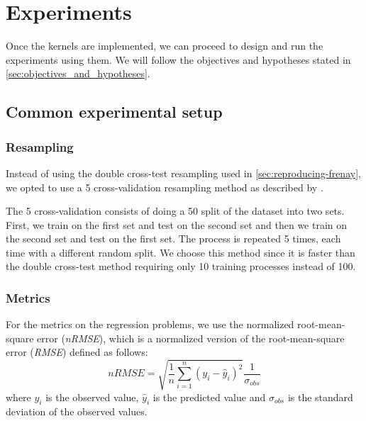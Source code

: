 \chapter{Experiments}
\label{sec:experiments}

Once the kernels are implemented, we can proceed to design and run the
experiments using them. We will follow the objectives and hypotheses stated in
\cref{sec:objectives_and_hypotheses}.

\section{Common experimental setup}

\subsection{Resampling}
\label{sec:resampling}

Instead of using the double cross-test resampling used in
\cref{sec:reproducing-frenay}, we opted to use a 5 cross-validation
resampling method as described by
\textcite{dietterichApproximateStatisticalTests1998}.

The 5 cross-validation consists of doing a 50 split of
the dataset into two sets. First, we train on the first set and test on the
second set and then we train on the second set and test on the first set. The
process is repeated 5 times, each time with a different random split. We choose
this method since it is faster than the double cross-test method requiring only
10 training processes instead of 100.


\subsection{Metrics}
\label{sec:metrics}

For the metrics on the regression problems,
we use the normalized root-mean-square error (\emph{nRMSE}),
which is a normalized version of the root-mean-square error (\emph{RMSE})
defined as follows:
\begin{equation}
    nRMSE = \sqrt{\frac{1}{n}\sum_{i=1}^n (y_i - \hat{y}_i)^2}\frac{1}{\sigma_{obs}}
\end{equation}
where $y_i$ is the observed value, $\hat{y}_i$ is the predicted value and
$\sigma_{obs}$ is the standard deviation of the observed values.

